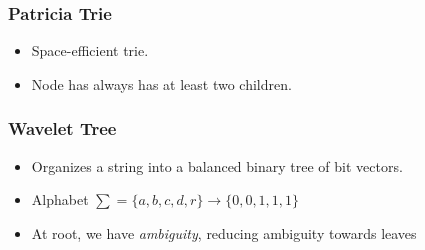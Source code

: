 \documentclass{beamer}
\begin{document}
\begin{frame}
\frametitle{Patricia Trie}
\begin{itemize}
  \item Space-efficient trie.
  \item Node has always has at least two children.
\end{itemize}
\begin{figure}
\end{figure}
\end{frame}


\begin{frame}
\frametitle{Wavelet Tree}
\begin{itemize}
  \item Organizes a string into a balanced binary tree of bit vectors.
  \item Alphabet $\sum = \{a,b,c,d,r\} \rightarrow \{0, 0, 1, 1, 1\}$
  \item At root, we have \emph{ambiguity}, reducing ambiguity towards leaves
\end{itemize}
\begin{figure}
\end{figure}
\end{frame}
\end{document}
